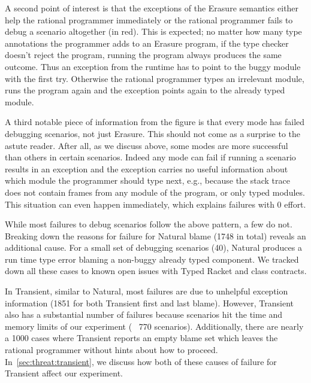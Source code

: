 A second point of interest is that the exceptions of
the Erasure semantics either help the rational programmer immediately or 
the rational programmer fails to debug a scenario altogether (in red).
This is expected; no matter how many type annotations the programmer
adds to an Erasure program, if the type checker doesn't reject the
program, running the program always produces the same outcome. Thus an
exception from the runtime has to point to the buggy module with
the first try. Otherwise the rational programmer types an irrelevant
module, runs the program again and the exception points again to the
already typed module. 

A third notable piece of information from
the figure is that every mode has failed debugging scenarios, not just
Erasure. This should
not come as a surprise to the astute
reader. After all, as we
discuss above, some modes are more successful than others in certain
scenarios. Indeed any mode can fail if running a scenario results in an
exception and the exception carries no useful information about which
module the programmer should type next, e.g., because the stack trace 
does not contain frames from any module of the program, or only typed modules. This situation
can even happen immediately, which explains failures with 0 effort. 


While most failures to debug scenarios follow the above pattern, a few do not.
Breaking down the reasons for failure for Natural blame (1748 in total)
reveals an additional cause. For a small set of
debugging scenarios (40), Natural produces a run time type error
blaming a non-buggy already typed
component. We tracked down all these cases to known open issues with Typed
Racket and class contracts. 

In Transient, similar to Natural,
most failures are due to unhelpful exception information (1851 for both
Transient first and last blame).  
However, Transient also has a substantial
number of failures because scenarios hit the time and memory
limits of our experiment (~ 770 scenarios).  Additionally, there are nearly a 1000 cases where
Transient reports an empty blame set which leaves the rational programmer
without hints about how to proceed.
In~\ref{sec:threat:transient}, we discuss how both of these causes of
failure for Transient affect our experiment. 

